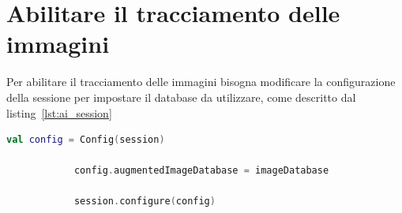 \documentclass[crop=false, class=book]{standalone}
\begin{document}
	\section{Abilitare il tracciamento delle immagini}
	Per abilitare il tracciamento delle immagini bisogna modificare la configurazione della sessione per impostare il database da utilizzare, come descritto dal listing~\vref{lst:ai_session}
	
	\begin{center}
		\begin{minipage}{0.95\textwidth}
			\begin{lstlisting}[caption={Creazione della sessione ARCore con Augmented Images.}, label={lst:ai_session}, language=Kotlin]
			val config = Config(session)
			
			config.augmentedImageDatabase = imageDatabase
			
			session.configure(config)
			\end{lstlisting}
		\end{minipage}
	\end{center}
\end{document}
